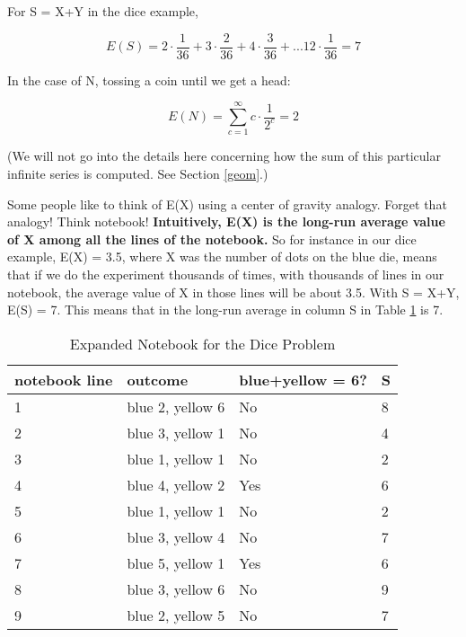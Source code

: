 For S = X+Y in the dice example,

\begin{equation}
\label{es}
E(S) = 
2 \cdot \frac{1}{36} +
3 \cdot \frac{2}{36} +
4 \cdot \frac{3}{36} +
...
12 \cdot \frac{1}{36} = 7
\end{equation}

In the case of N, tossing a coin until we get a head:

\begin{equation}
E(N) = \sum_{c=1}^\infty c \cdot \frac{1}{2^c} =  2
\end{equation}

(We will not go into the details here concerning how the sum of this
particular infinite series is computed.  See Section \ref{geom}.)

Some people like to think of E(X) using a center of gravity analogy.
Forget that analogy!  Think notebook!  {\bf Intuitively, E(X) is the
long-run average value of X among all the lines of the notebook.}  So
for instance in our dice example, E(X) = 3.5, where X was the number of
dots on the blue die, means that if we do the experiment thousands of
times, with thousands of lines in our notebook, the average value of X
in those lines will be about 3.5.   With S = X+Y, E(S) = 7.  This means
that in the long-run average in column S in Table \ref{dicenotebook2} is
7.

\begin{table}
\begin{center}
\vskip 0.5in

\begin{tabular}{|l|l|l|l|}
\hline
notebook line & outcome & blue+yellow = 6? & S \\ \hline 
\hline
1 & blue 2, yellow 6 & No & 8 \\ \hline 
2 & blue 3, yellow 1 & No & 4 \\ \hline 
3 & blue 1, yellow 1 & No & 2 \\ \hline 
4 & blue 4, yellow 2 & Yes & 6 \\ \hline 
5 & blue 1, yellow 1 & No & 2 \\ \hline 
6 & blue 3, yellow 4 & No & 7 \\ \hline 
7 & blue 5, yellow 1 & Yes & 6 \\ \hline 
8 & blue 3, yellow 6 & No & 9 \\ \hline 
9 & blue 2, yellow 5 & No & 7 \\ \hline 
\end{tabular}

\end{center}
\caption{Expanded Notebook for the Dice Problem}
\label{dicenotebook2} 
\end{table}

